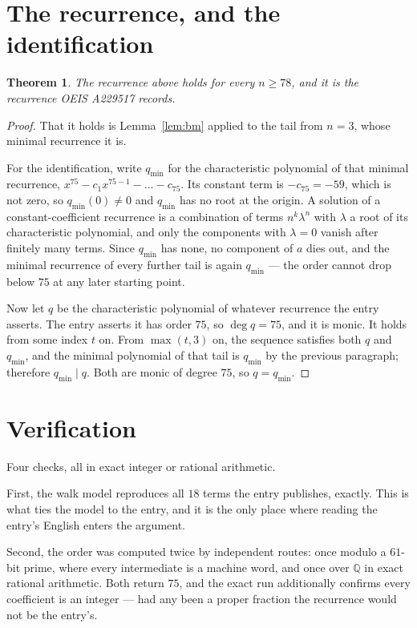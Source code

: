 \documentclass[11pt,a4paper]{article}
\theoremstyle{plain}
\newtheorem{theorem}{Theorem}
\theoremstyle{definition}
\begin{document}
\section{The recurrence, and the identification}

\begin{theorem}
The recurrence above holds for every $n\ge78$, and it is the recurrence OEIS A229517 records.
\end{theorem}

\begin{proof}
That it holds is Lemma~\ref{lem:bm} applied to the tail from $n=3$, whose minimal
recurrence it is.

For the identification, write $q_{\min}$ for the characteristic polynomial of that minimal
recurrence, $x^{75}-c_1x^{75-1}-\dots-c_{75}$. Its constant term is
$-c_{75}=-59$, which is not zero, so $q_{\min}(0)\neq0$ and $q_{\min}$ has no
root at the origin. A solution of a constant-coefficient recurrence is a combination of terms
$n^{k}\lambda^{n}$ with $\lambda$ a root of its characteristic polynomial, and only the
components with $\lambda=0$ vanish after finitely many terms. Since $q_{\min}$ has none, no
component of $a$ dies out, and the minimal recurrence of every further tail is again
$q_{\min}$ --- the order cannot drop below $75$ at any later starting point.

Now let $q$ be the characteristic polynomial of whatever recurrence the entry asserts. The
entry asserts it has order $75$, so $\deg q=75$, and it is monic. It holds from some
index $t$ on. From $\max(t,3)$ on, the sequence satisfies both $q$ and $q_{\min}$, and
the minimal polynomial of that tail is $q_{\min}$ by the previous paragraph; therefore
$q_{\min}\mid q$. Both are monic of degree $75$, so $q=q_{\min}$.
\end{proof}

\section{Verification}

Four checks, all in exact integer or rational arithmetic.

First, the walk model reproduces all $18$ terms the entry publishes, exactly. This is
what ties the model to the entry, and it is the only place where reading the entry's English
enters the argument.

Second, the order was computed twice by independent routes: once modulo a $61$-bit prime, where
every intermediate is a machine word, and once over $\mathbb{Q}$ in exact rational arithmetic.
Both return $75$, and the exact run additionally confirms every coefficient is an integer
--- had any been a proper fraction the recurrence would not be the entry's.
\end{document}
